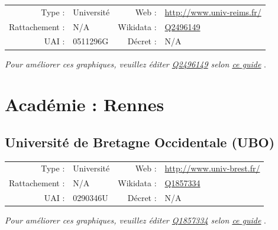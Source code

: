 \documentclass[12pt,french,landscape]{article}
\begin{document}
\begin{tabular*}{0.45\textwidth}{rp{2cm}rl}  
\hline  
Type : & Université & Web : &\href{http://www.univ-reims.fr/}{http://www.univ-reims.fr/} \\  
Rattachement : & N/A & Wikidata : & \href{https://www.wikidata.org/entity/Q2496149}{Q2496149} \\  
UAI : & 0511296G & Décret : & N/A \\  
\hline  
\end{tabular*}

\textit{\scriptsize Pour améliorer ces graphiques, veuillez éditer \href{https://www.wikidata.org/entity/Q2496149}{Q2496149}  selon \href{https://github.com/cpesr/wikidataESR/blob/master/Rmd/wikidataESR.md}{ce guide}}
.


\newpage

\hypertarget{acaduxe9mie-rennes}{%
\section{Académie : Rennes}\label{acaduxe9mie-rennes}}

\hypertarget{universituxe9-de-bretagne-occidentale-ubo}{%
\subsection{Université de Bretagne Occidentale
(UBO)}\label{universituxe9-de-bretagne-occidentale-ubo}}

\begin{tabular*}{0.45\textwidth}{rp{2cm}rl}  
\hline  
Type : & Université & Web : &\href{http://www.univ-brest.fr/}{http://www.univ-brest.fr/} \\  
Rattachement : & N/A & Wikidata : & \href{https://www.wikidata.org/entity/Q1857334}{Q1857334} \\  
UAI : & 0290346U & Décret : & N/A \\  
\hline  
\end{tabular*}

\textit{\scriptsize Pour améliorer ces graphiques, veuillez éditer \href{https://www.wikidata.org/entity/Q1857334}{Q1857334}  selon \href{https://github.com/cpesr/wikidataESR/blob/master/Rmd/wikidataESR.md}{ce guide}}
.

\end{document}
